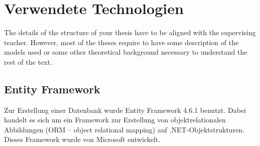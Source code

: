 \chapter{Verwendete Technologien}\label{cha:theoretical-background}
The details of the structure of your thesis have to be aligned with the supervising teacher. However, most of the theses require to have some description of the models used or some other theoretical background necessary to understand the rest of the text.
\section{Entity Framework}
Zur Erstellung einer Datenbank wurde Entity Framework 4.6.1 benutzt. Dabei handelt es sich um ein Framework zur Erstellung von objektrelationalen Abbildungen (ORM – object relational mapping) auf .NET-Objektstrukturen. Dieses Framework wurde von Microsoft entwickelt.